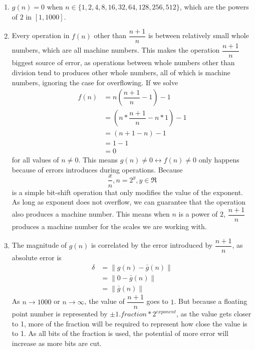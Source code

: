 \documentclass[10pt,a4paper, margin=1in]{article}
\begin{document}
\begin{enumerate}
\begin{enumerate}
    	\item %
    	$g(n) = 0$ when $n\in\{ 1, 2, 4, 8, 16, 32, 64, 128, 256, 512 \}$, which are the powers of $2$ in $[1, 1000]$.
    	\item %
    	Every operation in $f(n)$ other than $\dfrac{n+1}{n} $ is between relatively small whole numbers, which are all machine numbers. This makes the operation $\dfrac{n+1}{n} $ biggest source of error, as operations between whole numbers other than division tend to produces other whole numbers, all of which is machine numbers, ignoring the case for overflowing. If we solve
    	\begin{align*}
    		f(n) &= n\left( \dfrac{n+1}{n}-1\right)-1\\
    		&= \left( n*\dfrac{n+1}{n}-n*1\right)-1\\
    		&= \left(n+1-n \right) -1\\
    		&= 1-1\\
    		&= 0
    	\end{align*}
    	for all values of $n\neq 0$. This means $g(n)\neq 0 \leftrightarrow f(n) \neq 0$ only happens because of errors introduces during operations. Because $$\frac{x}{n}, n=2^y, y\in\Re$$ is a simple bit-shift operation that only modifies the value of the exponent. As long as exponent does not overflow, we can guarantee that the operation also produces a machine number. This means when $n$ is a power of $2$, $\dfrac{n+1}{n} $ produces a machine number for the scales we are working with.
    	\item %
    	The magnitude of $g(n)$ is correlated by the error introduced by $ \dfrac{n+1}{n}$, as absolute error is
    	\begin{align*}
    		\delta &= \|g(n)-\bar{g}(n) \|\\
    		&= \|0-\bar{g}(n)\|\\
    		&= \|\bar{g}(n) \|
		\end{align*}
		As $n\rightarrow 1000$ or $n\rightarrow \infty$, the value of $\dfrac{n+1}{n}$ goes to $1$. But because a floating point number is represented by $\pm1.\textit{fraction}*2^{\textit{exponent}}$, as the value gets closer to 1, more of the fraction will be required to represent how close the value is to 1. As all bits of the fraction is used, the potential of more error will increase as more bits are cut.
    \end{enumerate}


\end{enumerate}
\end{document}
